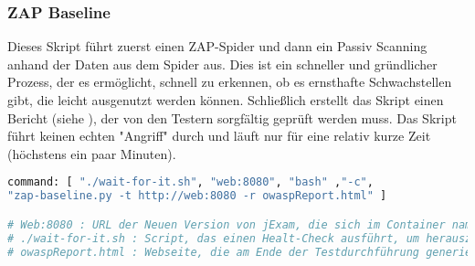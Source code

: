 \subsubsection{ZAP Baseline}

Dieses Skript führt zuerst einen ZAP-Spider und dann ein Passiv Scanning
anhand der Daten aus dem Spider aus. Dies ist ein schneller und gründlicher
Prozess, der es ermöglicht, schnell zu erkennen, ob es ernsthafte
Schwachstellen gibt, die leicht ausgenutzt werden können. Schließlich erstellt
das Skript einen Bericht (siehe ), der von den Testern sorgfältig geprüft werden muss.
Das Skript führt keinen echten "Angriff" durch und läuft nur für eine
relativ kurze Zeit (höchstens ein paar Minuten).


\begin{lstlisting}[language=Dockerfile,label={lst:baseline},caption={ZAP Baseline Script}]
command: [ "./wait-for-it.sh", "web:8080", "bash" ,"-c",
"zap-baseline.py -t http://web:8080 -r owaspReport.html" ]

# Web:8080 : URL der Neuen Version von jExam, die sich im Container namens Web befindet
# ./wait-for-it.sh : Script, das einen Healt-Check ausführt, um herauszufinden, ob die parametrisierte Anwendung (In diesem Fall Web:8080) bereits gestartet ist.
# owaspReport.html : Webseite, die am Ende der Testdurchführung generiert wird
\end{lstlisting}
